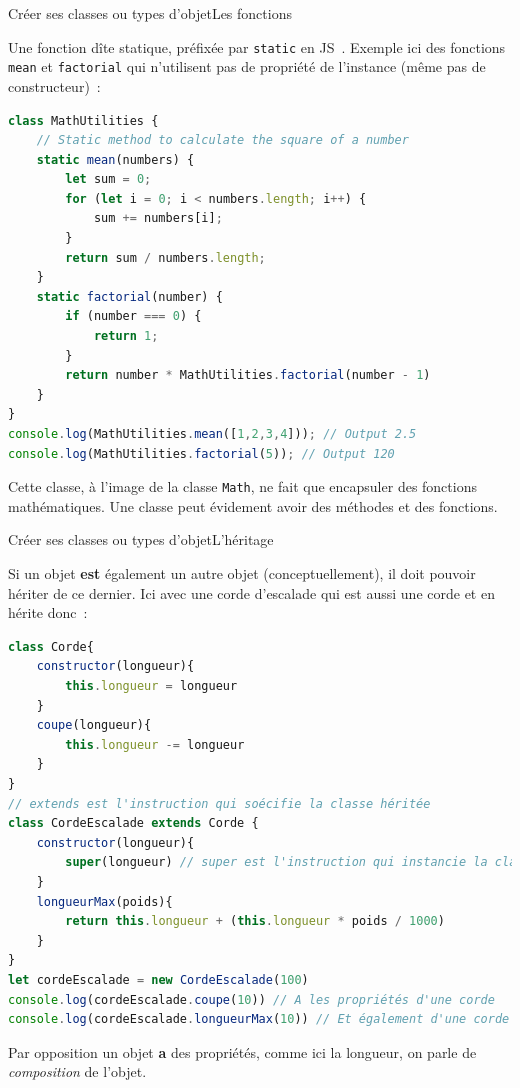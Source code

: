 \documentclass{beamer}
\begin{document}
    \begin{frame}[fragile]{Créer ses classes ou types d'objet}{Les fonctions}
        \begin{footnotesize}
            Une fonction dîte statique, préfixée par \lstinline{static} en JS~.
            Exemple ici des fonctions \lstinline{mean} et \lstinline{factorial} qui n'utilisent pas de propriété de l'instance (même pas de constructeur)~:
            \begin{lstlisting}[language=JavaScript,title={\tiny{Script JavaScript}},basicstyle=\tiny\ttfamily]
class MathUtilities {
    // Static method to calculate the square of a number
    static mean(numbers) {
        let sum = 0;
        for (let i = 0; i < numbers.length; i++) {
            sum += numbers[i];
        }
        return sum / numbers.length;
    }
    static factorial(number) {
        if (number === 0) {
            return 1;
        }
        return number * MathUtilities.factorial(number - 1)
    }
}
console.log(MathUtilities.mean([1,2,3,4])); // Output 2.5
console.log(MathUtilities.factorial(5)); // Output 120
            \end{lstlisting}
            Cette classe, à l'image de la classe \lstinline{Math}, ne fait que encapsuler des fonctions mathématiques.
            Une classe peut évidement avoir des méthodes et des fonctions.
        \end{footnotesize}
    \end{frame}

    \begin{frame}[fragile]{Créer ses classes ou types d'objet}{L'héritage}
        \begin{footnotesize}
            Si un objet \textbf{est} également un autre objet (conceptuellement), il doit pouvoir hériter de ce dernier.
            Ici avec une corde d'escalade qui est aussi une corde et en hérite donc~:
            \begin{lstlisting}[language=JavaScript,title={\tiny{Script JavaScript}},basicstyle=\tiny\ttfamily]
class Corde{
    constructor(longueur){
        this.longueur = longueur
    }
    coupe(longueur){
        this.longueur -= longueur
    }
}
// extends est l'instruction qui soécifie la classe héritée
class CordeEscalade extends Corde {
    constructor(longueur){
        super(longueur) // super est l'instruction qui instancie la classe mère
    }
    longueurMax(poids){
        return this.longueur + (this.longueur * poids / 1000)
    }
}
let cordeEscalade = new CordeEscalade(100)
console.log(cordeEscalade.coupe(10)) // A les propriétés d'une corde
console.log(cordeEscalade.longueurMax(10)) // Et également d'une corde d'escalade
            \end{lstlisting}
            Par opposition un objet \textbf{a} des propriétés, comme ici la longueur, on parle de \textit{composition} de l'objet.
        \end{footnotesize}
    \end{frame}
\end{document}
